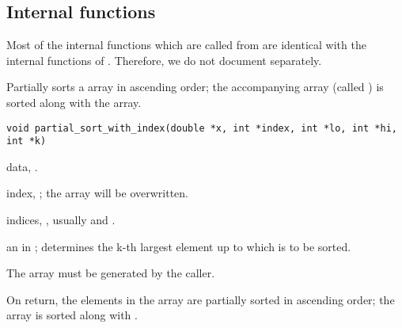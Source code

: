 \documentclass[a4paper,oneside,10pt,DIV=12]{scrartcl}
\def\DATA#1#2#3{
	\item[\code{#1}] #2, \code{double array[#3]}.}
\begin{document}
\subsection*{Internal functions}
%
Most of the internal functions which are called from
 are identical with the internal
functions of . Therefore, we do not
document separately.

\begin{Description}
Partially sorts a array  in ascending order; the accompanying
 array (called ) is sorted along with the array.
\end{Description}
\begin{Usage}
\begin{verbatim}
void partial_sort_with_index(double *x, int *index, int *lo, int *hi, int *k)
\end{verbatim}
\end{Usage}
\begin{Arguments}
	\begin{ldescription}
		\DATA{x}{data}{lo..hi}
		\item[\code{index}] index, ; the array will be
			overwritten.
		\item[\code{lo, hi}] indices, \code{[int]}, usually  and
			.
		\item[\code{k}] an \code{[int]} in ; determines the k-th largest
			element up to  which  is to be sorted.
	\end{ldescription}
\end{Arguments}
\begin{Details}
	The array  must be generated by the caller.
\end{Details}
\begin{Value}
On return, the elements  in the array  are
partially sorted in ascending order; the array  is sorted
along with .
\end{Value}
\end{document}
